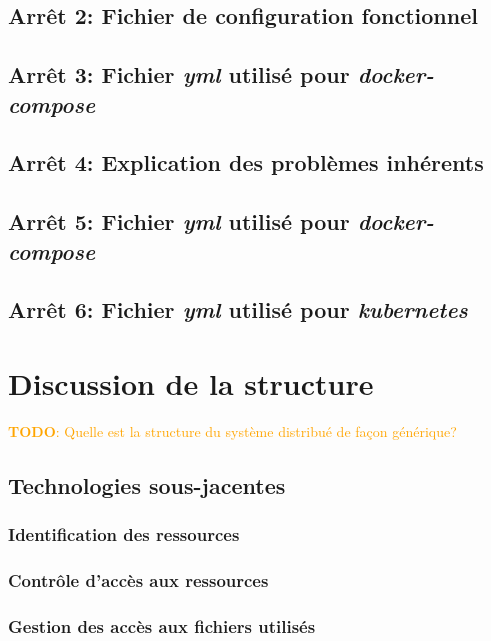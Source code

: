 \documentclass[a11paper, 11pt]{article}
\newcommand{\todo}[1]{\textcolor{orange}{\textbf{TODO}: #1}}
\begin{document}
\subsection{Arrêt 2: Fichier de configuration fonctionnel}


\newpage
\subsection{Arrêt 3: Fichier \textit{yml} utilisé pour \textit{docker-compose}}


\subsection{Arrêt 4: Explication des problèmes inhérents}

\subsection{Arrêt 5: Fichier \textit{yml} utilisé pour \textit{docker-compose}}

\subsection{Arrêt 6: Fichier \textit{yml} utilisé pour \textit{kubernetes}}

\section{Discussion de la structure}

\todo{Quelle est la structure du système distribué de façon générique?} \\

\subsection{Technologies sous-jacentes}

\subsubsection{Identification des ressources}

\subsubsection{Contrôle d'accès aux ressources}

\subsubsection{Gestion des accès aux fichiers utilisés}
\end{document}

